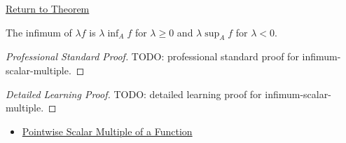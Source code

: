 \newpage
{}
\label{prf:infimum-scalar-multiple}

\begin{remark*}[Return]
\hyperref[thm:infimum-scalar-multiple]{Return to Theorem}
\end{remark*}

\begin{theorem*}
The infimum of \(\lambda f\) is \(\lambda\inf_A f\) for \(\lambda\geq0\) and \(\lambda\sup_A f\) for \(\lambda<0\).
\end{theorem*}

\begin{proof}[Professional Standard Proof]
\LRAProofBodyStart
TODO: professional standard proof for infimum-scalar-multiple.
\end{proof}

\begin{proof}[Detailed Learning Proof]
\LRAProofBodyStart
TODO: detailed learning proof for infimum-scalar-multiple.
\end{proof}

\begin{remark*}
\end{remark*}

\begin{dependencies}
\begin{itemize}
  \item \hyperref[def:pointwise-scalar-multiple-of-a-function]{Pointwise Scalar Multiple of a Function}
\end{itemize}
\end{dependencies}

\clearpage
